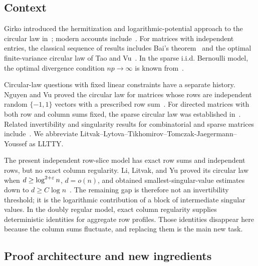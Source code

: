 \subsection{Context}

Girko introduced the hermitization and logarithmic-potential approach to the circular law in~\cite{Gir85}; modern accounts include~\cite{BC12,TV10}. For matrices with independent entries, the classical sequence of results includes Bai's theorem~\cite{Bai97} and the optimal finite-variance circular law of Tao and Vu~\cite{TV10}. In the sparse i.i.d. Bernoulli model, the optimal divergence condition $np\to\infty$ is known from~\cite{RT19,SSS25}.

Circular-law questions with fixed linear constraints have a separate history. Nguyen and Vu proved the circular law for matrices whose rows are independent random $\{-1,1\}$ vectors with a prescribed row sum~\cite{NV13}. For directed matrices with both row and column sums fixed, the sparse circular law was established in~\cite{Coo19,LLTTY21}. Related invertibility and singularity results for combinatorial and sparse matrices include~\cite{Tra20,FKS22,LLY26a}. We abbreviate Litvak--Lytova--Tikhomirov--Tomczak-Jaegermann--Youssef as LLTTY.

The present independent row-slice model has exact row sums and independent rows, but no exact column regularity. Li, Litvak, and Yu proved its circular law when $d\ge\log^{2+\varepsilon}n$, $d=o(n)$, and obtained smallest-singular-value estimates down to $d\ge C\log n$~\cite{LLY26a}. The remaining gap is therefore not an invertibility threshold; it is the logarithmic contribution of a block of intermediate singular values. In the doubly regular model, exact column regularity supplies deterministic identities for aggregate row profiles. Those identities disappear here because the column sums fluctuate, and replacing them is the main new task.

\subsection{Proof architecture and new ingredients}

